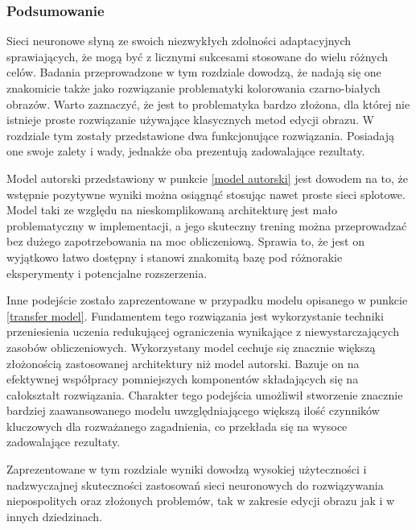   \subsubsection{Podsumowanie}

  Sieci neuronowe słyną ze swoich niezwykłych zdolności adaptacyjnych
  sprawiających, że mogą być z licznymi sukcesami stosowane do wielu różnych celów.
  Badania przeprowadzone w tym rozdziale dowodzą, że nadają się one znakomicie
  także jako rozwiązanie problematyki kolorowania czarno-białych obrazów.
  Warto zaznaczyć, że jest to problematyka bardzo złożona, dla której nie
  istnieje proste rozwiązanie używające klasycznych metod edycji obrazu.
  W rozdziale tym zostały przedstawione dwa funkcjonujące rozwiązania.
  Posiadają one swoje zalety i wady, jednakże oba prezentują zadowalające
  rezultaty.

  Model autorski przedstawiony w punkcie \ref{model autorski}
  jest dowodem na to, że wstępnie pozytywne wyniki można osiągnąć
  stosując nawet proste sieci splotowe. Model taki ze względu na
  nieskomplikowaną architekturę jest mało problematyczny w implementacji, a jego
  skuteczny trening można przeprowadzać bez dużego zapotrzebowania na moc
  obliczeniową. Sprawia to, że jest on wyjątkowo łatwo dostępny i stanowi
  znakomitą bazę pod różnorakie eksperymenty i potencjalne rozszerzenia.

  Inne podejście zostało zaprezentowane w przypadku modelu opisanego w punkcie
  \ref{transfer model}. Fundamentem tego rozwiązania jest wykorzystanie
  techniki przeniesienia uczenia redukującej ograniczenia wynikające z
  niewystarczających zasobów obliczeniowych. Wykorzystany model cechuje się
  znacznie większą złożonością zastosowanej architektury niż model autorski.
  Bazuje on na efektywnej współpracy pomniejszych komponentów składających się
  na całokształt rozwiązania. Charakter tego podejścia umożliwił stworzenie
  znacznie bardziej zaawansowanego modelu uwzględniającego większą ilość czynników
  kluczowych dla rozważanego zagadnienia, co przekłada się na wysoce zadowalające
  rezultaty.

  Zaprezentowane w tym rozdziale wyniki dowodzą wysokiej użyteczności i
  nadzwyczajnej skuteczności zastosowań sieci neuronowych do rozwiązywania
  niepospolitych oraz złożonych problemów, tak w zakresie edycji obrazu jak i
  w innych dziedzinach.
